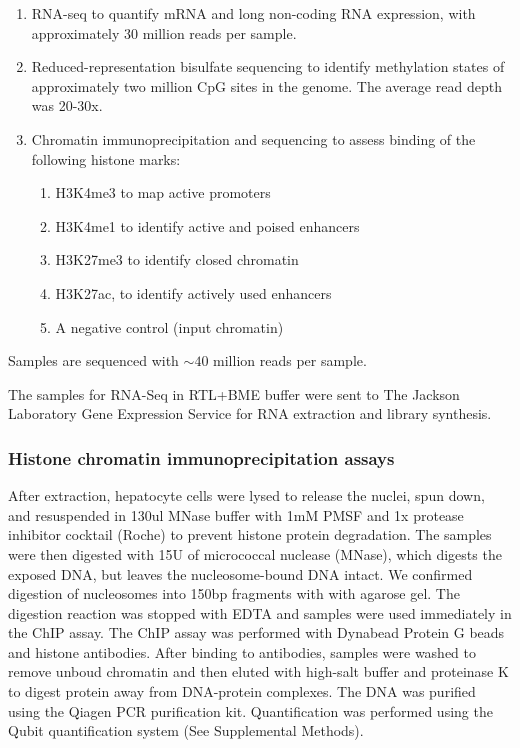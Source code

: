 \documentclass[10pt,letterpaper]{article}
\providecommand{\tightlist}{%
  \setlength{\itemsep}{0pt}\setlength{\parskip}{0pt}}
\begin{document}
\begin{enumerate}
\def\labelenumi{\arabic{enumi}.}
\tightlist
\item
  RNA-seq to quantify mRNA and long non-coding RNA expression, with
  approximately 30 million reads per sample.
\item
  Reduced-representation bisulfate sequencing to identify methylation
  states of approximately two million CpG sites in the genome. The
  average read depth was 20-30x.
\item
  Chromatin immunoprecipitation and sequencing to assess binding of the
  following histone marks:

  \begin{enumerate}
  \def\labelenumii{\alph{enumii}.}
  \tightlist
  \item
    H3K4me3 to map active promoters
  \item
    H3K4me1 to identify active and poised enhancers
  \item
    H3K27me3 to identify closed chromatin
  \item
    H3K27ac, to identify actively used enhancers
  \item
    A negative control (input chromatin)
  \end{enumerate}
\end{enumerate}

Samples are sequenced with \(\sim40\) million reads per sample.

The samples for RNA-Seq in RTL+BME buffer were sent to The Jackson
Laboratory Gene Expression Service for RNA extraction and library
synthesis.

\hypertarget{histone-chromatin-immunoprecipitation-assays}{%
\subsubsection{Histone chromatin immunoprecipitation
assays}\label{histone-chromatin-immunoprecipitation-assays}}

After extraction, hepatocyte cells were lysed to release the nuclei,
spun down, and resuspended in 130ul MNase buffer with 1mM PMSF and 1x
protease inhibitor cocktail (Roche) to prevent histone protein
degradation. The samples were then digested with 15U of micrococcal
nuclease (MNase), which digests the exposed DNA, but leaves the
nucleosome-bound DNA intact. We confirmed digestion of nucleosomes into
150bp fragments with with agarose gel. The digestion reaction was
stopped with EDTA and samples were used immediately in the ChIP assay.
The ChIP assay was performed with Dynabead Protein G beads and histone
antibodies. After binding to antibodies, samples were washed to remove
unboud chromatin and then eluted with high-salt buffer and proteinase K
to digest protein away from DNA-protein complexes. The DNA was purified
using the Qiagen PCR purification kit. Quantification was performed
using the Qubit quantification system (See Supplemental Methods).
\end{document}
